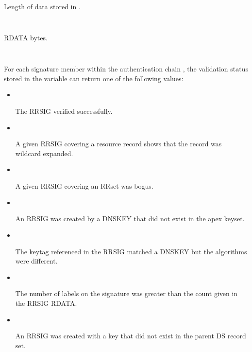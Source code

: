 \begin{description}
\begin{description}

\item {}\verb" "

Length of data stored in .

\item {}\verb" "

RDATA bytes.

\item {}\verb" "

For each signature  member within the authentication chain
, the validation status stored in the variable
 can return one of the following values:

\begin{itemize}

\item {}\verb" "

The RRSIG verified successfully.

\item {}\verb" "

A given RRSIG covering a resource record shows that the record was wildcard
expanded.

\item {}\verb" "

A given RRSIG covering an RRset was bogus.

\item {}\verb" "

An RRSIG was created by a DNSKEY that did not exist in the apex keyset.

\item {}\verb" "

The keytag referenced in the RRSIG matched a DNSKEY but the algorithms were
different.

\item {}\verb" "

The number of labels on the signature was greater than the count given in
the RRSIG RDATA.

\item {}\verb" "

An RRSIG was created with a key that did not exist in the parent DS record
set.


\end{itemize}
\end{description}
\end{description}
